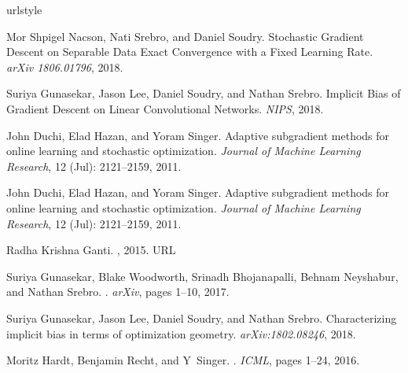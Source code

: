 \documentclass[twoside,11pt,english]{article}
\begin{document}
\pagebreak
\begin{thebibliography}{21}
	\providecommand{\natexlab}[1]{#1}
	\providecommand{\url}[1]{\texttt{#1}}
	\expandafter\ifx\csname urlstyle\endcsname\relax
	\providecommand{\doi}[1]{doi: #1}\else
	\providecommand{\doi}{doi: \begingroup \urlstyle{rm}\Url}\fi
	
	Mor Shpigel Nacson, Nati Srebro, and Daniel Soudry.
	\newblock  Stochastic Gradient Descent on Separable Data Exact Convergence with a Fixed Learning Rate.
	\newblock \emph{arXiv 1806.01796}, 2018.
	
	Suriya Gunasekar, Jason Lee, Daniel Soudry, and Nathan Srebro.
	\newblock  Implicit Bias of Gradient Descent on Linear Convolutional Networks.
	\newblock \emph{NIPS}, 2018.


	John Duchi, Elad Hazan, and Yoram Singer.
	\newblock Adaptive subgradient methods for online learning and stochastic
	optimization.
	\newblock \emph{Journal of Machine Learning Research}, 12
	(Jul): 2121--2159, 2011.
	
	John Duchi, Elad Hazan, and Yoram Singer.
	\newblock Adaptive subgradient methods for online learning and stochastic
	optimization.
	\newblock \emph{Journal of Machine Learning Research}, 12
	(Jul): 2121--2159, 2011.
	
	Radha Krishna Ganti.
	, 2015.
	\newblock URL
	
	Suriya Gunasekar, Blake Woodworth, Srinadh Bhojanapalli, Behnam Neyshabur, and
	Nathan Srebro.
	.
	\newblock \emph{arXiv}, pages 1--10, 2017.
	
	Suriya Gunasekar, Jason Lee, Daniel Soudry, and Nathan Srebro.
	\newblock Characterizing implicit bias in terms of optimization geometry.
	\newblock \emph{arXiv:1802.08246}, 2018.
	
	Moritz Hardt, Benjamin Recht, and Y~Singer.
	.
	\newblock \emph{ICML}, pages 1--24, 2016.
	

\end{thebibliography}
\end{document}
